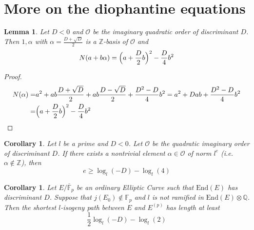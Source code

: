 \documentclass{scrartcl}
\newcommand{\Z}{\mathbb{Z}}
\newcommand{\F}{\mathbb{F}}
\newcommand{\End}{\mathrm{End}}
\renewcommand{\O}{\mathcal{O}}
\newtheorem{lemma}[prop]{Lemma}
\newtheorem{corollary}[prop]{Corollary}
\theoremstyle{definition}
\begin{document}
\section{More on the diophantine equations}
\begin{lemma}
    Let $D < 0$ and $\O$ be the imaginary quadratic order of discriminant $D$.
    Then $1, \alpha$ with $\alpha = \frac {D + \sqrt{D}} 2$ is a $\Z$-basis of $\O$ and
    \begin{equation*}
        N(a + b\alpha) = \Bigl(a + \frac D 2 b\Bigr)^2 - \frac D 4 b^2
    \end{equation*}
\end{lemma}
\begin{proof}
    \begin{align*}
        N(\alpha) =& a^2 + ab \frac {D + \sqrt{D}} 2 + ab \frac {D - \sqrt{D}} 2 + \frac {D^2 - D} 4 b^2 = a^2 + Dab + \frac {D^2 - D} 4 b^2 \\
        =& \Bigl(a + \frac D 2 b\Bigr)^2 - \frac D 4 b^2
    \end{align*}
\end{proof}
\begin{corollary}
    Let $l$ be a prime and $D < 0$.
    Let $\O$ be the quadratic imaginary order of discriminant $D$.
    If there exists a nontrivial element $\alpha \in \O$ of norm $l^e$ (i.e. $\alpha \notin \Z$), then
    \begin{equation*}
        e \geq \log_l(-D) - \log_l(4)
    \end{equation*} 
\end{corollary}
\begin{corollary}
    Let $E/\bar{\F}_p$ be an ordinary Elliptic Curve such that $\End(E)$ has discriminant $D$.
    Suppose that $j(E_0) \notin \F_p$ and $l$ is not ramified in $\End(E) \otimes \mathbb{Q}$.
    Then the shortest $l$-isogeny path between $E$ and $E^{(p)}$ has length at least
    \begin{equation*}
        \frac 1 2 \log_l(-D) - \log_l(2)
    \end{equation*}
\end{corollary}
\end{document}
